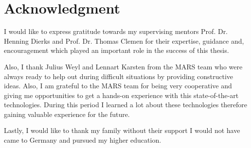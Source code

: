 \newpage
\thispagestyle{empty}
\section*{Acknowledgment}
I would like to express gratitude towards my supervising mentors Prof. Dr. Henning Dierks and Prof. Dr. Thomas Clemen for their expertise, guidance and, 
encouragement which played an important role in the success of this thesis. 

Also, I thank Julius Weyl and Lennart Karsten from the MARS team who were always ready to help out during difficult situations by providing constructive
ideas. Also, I am grateful to the MARS team for being very cooperative and giving me opportunities to get a hands-on experience with this state-of-the-art technologies.
During this period I learned a lot about these technologies therefore
gaining valuable experience for the future.

Lastly, I would like to thank my family without their support I would not have came to Germany and pursued my higher education.
